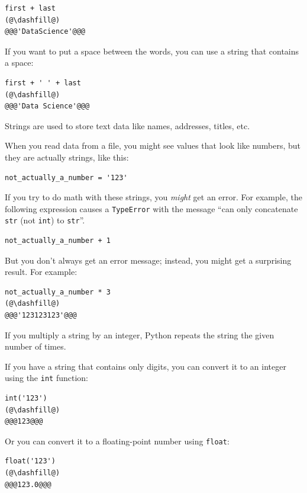 \begin{lstlisting}[]
first + last
(@\dashfill@)
@@@'DataScience'@@@
\end{lstlisting}

If you want to put a space between the words, you can use a string that
contains a space:

\begin{lstlisting}[]
first + ' ' + last
(@\dashfill@)
@@@'Data Science'@@@
\end{lstlisting}

Strings are used to store text data like names, addresses, titles, etc.

When you read data from a file, you might see values that look like
numbers, but they are actually strings, like this:

\begin{lstlisting}[]
not_actually_a_number = '123'
\end{lstlisting}

If you try to do math with these strings, you \emph{might} get an error.
For example, the following expression causes a
\passthrough{\lstinline!TypeError!} with the message ``can only
concatenate \passthrough{\lstinline!str!} (not
\passthrough{\lstinline!int!}) to \passthrough{\lstinline!str!}''.

\begin{lstlisting}
not_actually_a_number + 1
\end{lstlisting}

But you don't always get an error message; instead, you might get a
surprising result. For example:

\begin{lstlisting}[]
not_actually_a_number * 3
(@\dashfill@)
@@@'123123123'@@@
\end{lstlisting}

If you multiply a string by an integer, Python repeats the string the
given number of times.

If you have a string that contains only digits, you can convert it to an
integer using the \passthrough{\lstinline!int!} function:

\begin{lstlisting}[]
int('123')
(@\dashfill@)
@@@123@@@
\end{lstlisting}

Or you can convert it to a floating-point number using
\passthrough{\lstinline!float!}:

\begin{lstlisting}[]
float('123')
(@\dashfill@)
@@@123.0@@@
\end{lstlisting}

